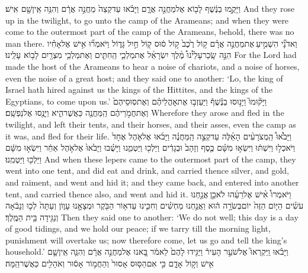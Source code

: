 {וַיָּקֻ֣מוּ בַנֶּ֔שֶׁף לָב֖וֹא אֶל\maqqaf מַחֲנֵ֣ה אֲרָ֑ם וַיָּבֹ֗אוּ עַד\maqqaf קְצֵה֙ מַחֲנֵ֣ה אֲרָ֔ם וְהִנֵּ֥ה אֵֽין\maqqaf שָׁ֖ם אִֽישׁ׃}
{And they rose up in the twilight, to go unto the camp of the Arameans; and when they were come to the outermost part of the camp of the Arameans, behold, there was no man there.}
{וַאדֹנָ֞י הִשְׁמִ֣יעַ \legarmeh  אֶת\maqqaf מַחֲנֵ֣ה אֲרָ֗ם ק֥וֹל רֶ֙כֶב֙ ק֣וֹל ס֔וּס ק֖וֹל חַ֣יִל גָּד֑וֹל וַיֹּאמְר֞וּ אִ֣ישׁ אֶל\maqqaf אָחִ֗יו הִנֵּ֣ה שָֽׂכַר\maqqaf עָלֵ֩ינוּ֩ מֶ֨לֶךְ יִשְׂרָאֵ֜ל אֶת\maqqaf מַלְכֵ֧י הַֽחִתִּ֛ים וְאֶת\maqqaf מַלְכֵ֥י מִצְרַ֖יִם לָב֥וֹא עָלֵֽינוּ׃}
{For the Lord had made the host of the Arameans to hear a noise of chariots, and a noise of horses, even the noise of a great host; and they said one to another: ‘Lo, the king of Israel hath hired against us the kings of the Hittites, and the kings of the Egyptians, to come upon us.’}
{וַיָּק֘וּמוּ֮ וַיָּנ֣וּסוּ בַנֶּ֒שֶׁף֒ וַיַּעַזְב֣וּ אֶת\maqqaf אׇהֳלֵיהֶ֗ם וְאֶת\maqqaf סֽוּסֵיהֶם֙ וְאֶת\maqqaf חֲמֹ֣רֵיהֶ֔ם הַֽמַּחֲנֶ֖ה כַּאֲשֶׁר\maqqaf הִ֑יא וַיָּנֻ֖סוּ אֶל\maqqaf נַפְשָֽׁם׃}
{Wherefore they arose and fled in the twilight, and left their tents, and their horses, and their asses, even the camp as it was, and fled for their life.}
{וַיָּבֹ֩אוּ֩ הַֽמְצֹרָעִ֨ים הָאֵ֜לֶּה עַד\maqqaf קְצֵ֣ה הַֽמַּחֲנֶ֗ה וַיָּבֹ֜אוּ אֶל\maqqaf אֹ֤הֶל אֶחָד֙ וַיֹּאכְל֣וּ וַיִּשְׁתּ֔וּ וַיִּשְׂא֣וּ מִשָּׁ֗ם כֶּ֤סֶף וְזָהָב֙ וּבְגָדִ֔ים וַיֵּלְכ֖וּ וַיַּטְמִ֑נוּ וַיָּשֻׁ֗בוּ וַיָּבֹ֙אוּ֙ אֶל\maqqaf אֹ֣הֶל אַחֵ֔ר וַיִּשְׂא֣וּ מִשָּׁ֔ם וַיֵּלְכ֖וּ וַיַּטְמִֽנוּ׃}
{And when these lepers came to the outermost part of the camp, they went into one tent, and did eat and drink, and carried thence silver, and gold, and raiment, and went and hid it; and they came back, and entered into another tent, and carried thence also, and went and hid it.}
{וַיֹּאמְרוּ֩ אִ֨ישׁ אֶל\maqqaf רֵעֵ֜הוּ לֹא\maqqaf כֵ֣ן \legarmeh  אֲנַ֣חְנוּ עֹשִׂ֗ים הַיּ֤וֹם הַזֶּה֙ יוֹם\maqqaf בְּשֹׂרָ֣ה ה֔וּא וַאֲנַ֣חְנוּ מַחְשִׁ֗ים וְחִכִּ֛ינוּ עַד\maqqaf א֥וֹר הַבֹּ֖קֶר וּמְצָאָ֣נוּ עָו֑וֹן וְעַתָּה֙ לְכ֣וּ וְנָבֹ֔אָה וְנַגִּ֖ידָה בֵּ֥ית הַמֶּֽלֶךְ׃}
{Then they said one to another: ‘We do not well; this day is a day of good tidings, and we hold our peace; if we tarry till the morning light, punishment will overtake us; now therefore come, let us go and tell the king’s household.’}
{וַיָּבֹ֗אוּ וַֽיִּקְרְאוּ֮ אֶל\maqqaf שֹׁעֵ֣ר הָעִיר֒ וַיַּגִּ֤ידוּ לָהֶם֙ לֵאמֹ֔ר בָּ֚אנוּ אֶל\maqqaf מַחֲנֵ֣ה אֲרָ֔ם וְהִנֵּ֧ה אֵֽין\maqqaf שָׁ֛ם אִ֖ישׁ וְק֣וֹל אָדָ֑ם כִּ֣י אִם\maqqaf הַסּ֤וּס אָסוּר֙ וְהַחֲמ֣וֹר אָס֔וּר וְאֹהָלִ֖ים כַּאֲשֶׁר\maqqaf הֵֽמָּה׃}
